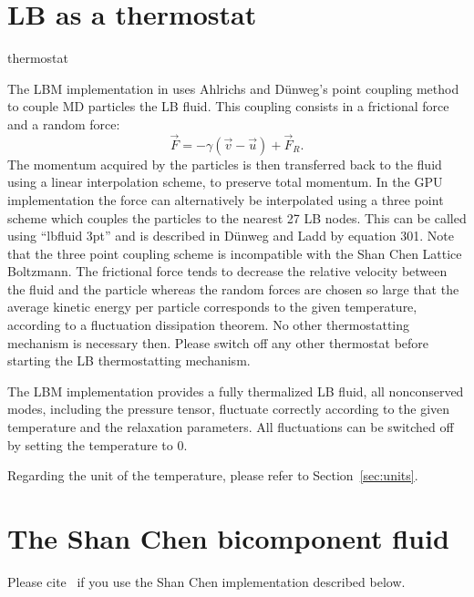 \section{LB as a thermostat}
\begin{essyntax}
  thermostat  
  \begin{features}
  \end{features}
\end{essyntax}
The LBM implementation in \es uses Ahlrichs and D\"unweg's point coupling method
to couple MD particles the LB fluid. This coupling consists
in a frictional force and a random force:
\begin{equation*}
  \vec{F} = -\gamma \left(\vec{v}-\vec{u}\right) + \vec{F}_R.
\end{equation*}
The momentum acquired by the particles is then transferred back to the fluid
using a linear interpolation scheme, to preserve total momentum.  In the GPU
implementation the force can alternatively be interpolated using a three point
scheme which couples the particles to the nearest 27 LB nodes.  This can be
called using ``lbfluid  3pt'' and is described in D\"{u}nweg and
Ladd by equation 301\cite{duenweg08a}. Note that the three point coupling
scheme is incompatible with the Shan Chen Lattice Boltzmann.  The frictional
force tends to decrease the relative velocity between the fluid and the
particle whereas the random forces are chosen so large that the average kinetic
energy per particle corresponds to the given temperature, according to a
fluctuation dissipation theorem.  No other thermostatting mechanism is
necessary then. Please switch off any other thermostat before starting the LB
thermostatting mechanism.

The LBM implementation provides a fully thermalized LB fluid, \ie all
nonconserved modes, including the pressure tensor, fluctuate correctly
according to the given temperature and the relaxation parameters. All
fluctuations can be switched off by setting the temperature to 0.

Regarding the unit of the temperature, please refer to
Section~\ref{sec:units}.

\section{The Shan Chen bicomponent fluid\label{sec:shanchen}}
\begin{citebox}
  Please cite~ if you use the Shan Chen implementation
  described below.
\end{citebox}



